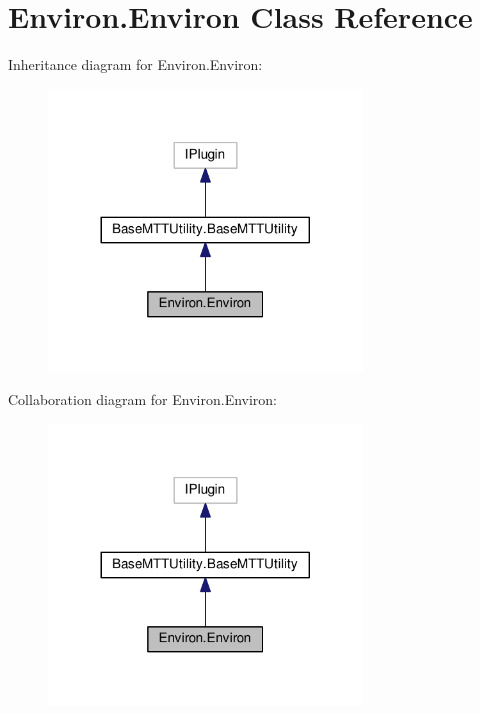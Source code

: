 \hypertarget{classEnviron_1_1Environ}{\section{Environ.\-Environ Class Reference}
\label{classEnviron_1_1Environ}
}


Inheritance diagram for Environ.\-Environ\-:
\nopagebreak
\begin{figure}[H]
\begin{center}
\leavevmode
\includegraphics[width=236pt]{classEnviron_1_1Environ__inherit__graph}
\end{center}
\end{figure}


Collaboration diagram for Environ.\-Environ\-:
\nopagebreak
\begin{figure}[H]
\begin{center}
\leavevmode
\includegraphics[width=236pt]{classEnviron_1_1Environ__coll__graph}
\end{center}
\end{figure}
